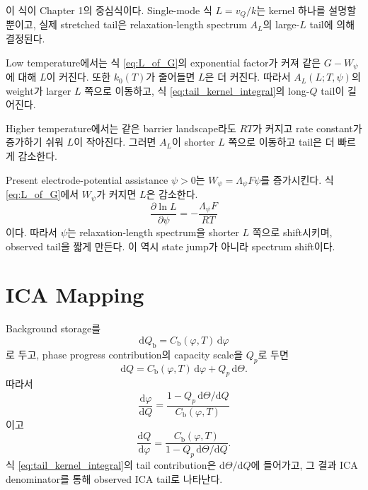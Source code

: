 \documentclass[11pt,a4paper]{article}
\newcommand{\dd}{\mathrm{d}}
\begin{document}
이 식이 Chapter 1의 중심식이다. Single-mode 식 \(L=v_Q/k\)는 kernel 하나를 설명할 뿐이고, 실제 stretched tail은 relaxation-length spectrum \(A_L\)의 large-\(L\) tail에 의해 결정된다.

Low temperature에서는 식 \eqref{eq:L_of_G}의 exponential factor가 커져 같은 \(G-W_\psi\)에 대해 \(L\)이 커진다. 또한 \(k_0(T)\)가 줄어들면 \(L\)은 더 커진다. 따라서 \(A_L(L;T,\psi)\)의 weight가 larger \(L\) 쪽으로 이동하고, 식 \eqref{eq:tail_kernel_integral}의 long-\(Q\) tail이 길어진다.

Higher temperature에서는 같은 barrier landscape라도 \(RT\)가 커지고 rate constant가 증가하기 쉬워 \(L\)이 작아진다. 그러면 \(A_L\)이 shorter \(L\) 쪽으로 이동하고 tail은 더 빠르게 감소한다.

Present electrode-potential assistance \(\psi>0\)는 \(W_\psi=\Lambda_\psi F\psi\)를 증가시킨다. 식 \eqref{eq:L_of_G}에서 \(W_\psi\)가 커지면 \(L\)은 감소한다.
\begin{equation}
\frac{\partial\ln L}{\partial\psi}
=
-\frac{\Lambda_\psi F}{RT}
\label{eq:potential_shift}
\end{equation}
이다. 따라서 \(\psi\)는 relaxation-length spectrum을 shorter \(L\) 쪽으로 shift시키며, observed tail을 짧게 만든다. 이 역시 state jump가 아니라 spectrum shift이다.

\section{ICA Mapping}

Background storage를
\begin{equation}
\dd Q_{\mathrm b}
=
C_{\mathrm b}(\varphi,T)\,\dd\varphi
\end{equation}
로 두고, phase progress contribution의 capacity scale을 \(Q_p\)로 두면
\begin{equation}
\dd Q
=
C_{\mathrm b}(\varphi,T)\,\dd\varphi
+
Q_p\,\dd\Theta .
\label{eq:storage}
\end{equation}
따라서
\begin{equation}
\frac{\dd\varphi}{\dd Q}
=
\frac{
1-Q_p\,\dd\Theta/\dd Q
}{
C_{\mathrm b}(\varphi,T)
}
\label{eq:dva}
\end{equation}
이고
\begin{equation}
\boxed{
\frac{\dd Q}{\dd\varphi}
=
\frac{
C_{\mathrm b}(\varphi,T)
}{
1-Q_p\,\dd\Theta/\dd Q
}.
}
\label{eq:ica}
\end{equation}
식 \eqref{eq:tail_kernel_integral}의 tail contribution은 \(\dd\Theta/\dd Q\)에 들어가고, 그 결과 ICA denominator를 통해 observed ICA tail로 나타난다.
\end{document}
